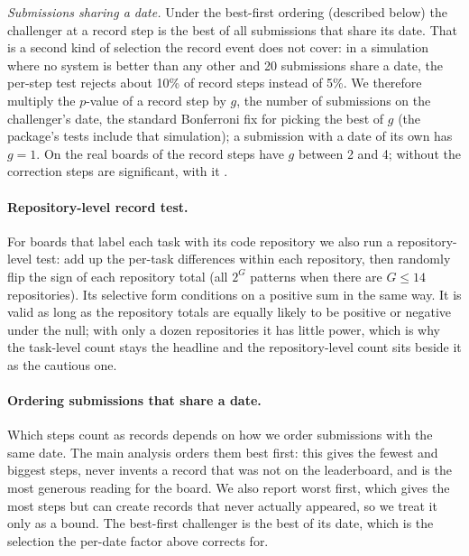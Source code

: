 \documentclass[11pt]{article}
\begin{document}
\emph{Submissions sharing a date.}
Under the best-first ordering (described below) the challenger at a record step is the best of all submissions that share its date.
That is a second kind of selection the record event does not cover: in a simulation where no system is better than any other and 20 submissions share a date, the per-step test rejects about 10\% of record steps instead of 5\%.
We therefore multiply the $p$-value of a record step by $g$, the number of submissions on the challenger's date, the standard Bonferroni fix for picking the best of $g$ (the package's tests include that simulation); a submission with a date of its own has $g=1$.
On the real boards \NumTotalDateGroupSteps{} of the \NumTotalSteps{} record steps have $g$ between 2 and 4; without the correction \NumTotalSigUncorrected{} steps are significant, with it \NumTotalSig{}.

\paragraph{Repository-level record test.}
For boards that label each task with its code repository we also run a repository-level test: add up the per-task differences within each repository, then randomly flip the sign of each repository total (all $2^G$ patterns when there are $G\le 14$ repositories).
Its selective form conditions on a positive sum in the same way.
It is valid as long as the repository totals are equally likely to be positive or negative under the null; with only a dozen repositories it has little power, which is why the task-level count stays the headline and the repository-level count sits beside it as the cautious one.

\paragraph{Ordering submissions that share a date.}
Which steps count as records depends on how we order submissions with the same date.
The main analysis orders them best first: this gives the fewest and biggest steps, never invents a record that was not on the leaderboard, and is the most generous reading for the board.
We also report worst first, which gives the most steps but can create records that never actually appeared, so we treat it only as a bound.
The best-first challenger is the best of its date, which is the selection the per-date factor above corrects for.
\end{document}
